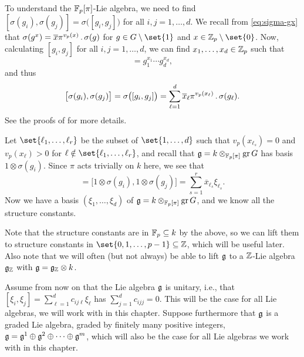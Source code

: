 To understand the $\mathbb{F}_{p}[\pi]$-Lie algebra, we need to find $[\sigma(g_{i}),\sigma(g_{j})] = \sigma\bigl( [g_{i},g_{j}] \bigr)$ for all $i,j = 1,\dotsc,d$. We recall from \eqref{eq:sigma-gx} that $\sigma(g^{x}) = \overline{x}\pi^{v_{p}(x)} \,.\, \sigma(g)$ for $g \in G \setminus\set{1}$ and $x \in \Z_{p}\setminus\set{0}$. Now, calculating $[g_{i},g_{j}]$ for all $i,j = 1,\dotsc,d$, we can find $x_{1},\dotsc,x_{d} \in \mathbb{Z}_{p}$ such that
\begin{equation*}
  [g_{i},g_{j}] = g_{1}^{x_{1}} \dotsb g_{d}^{x_{d}},
\end{equation*}
and thus
\begin{equation*}
  \bigl[ \sigma(g_{i}),\sigma(g_{j}) \bigr] = \sigma\bigl( [g_{i},g_{j}] \bigr) = \sum_{\ell=1}^{d} \overline{x}_{\ell}\pi^{v_{p}(x_{\ell})} \,.\, \sigma(g_{\ell}).
\end{equation*}
See the proofs of \cite[Lem.~26.4 and Prop.~26.5]{Sch} for more details.

Let $\set{\ell_{1},\dotsc,\ell_{r}}$ be the subset of $\set{1,\dotsc,d}$ such that $v_{p}(x_{\ell_{s}}) = 0$ and $v_{p}(x_{\ell}) > 0$ for $\ell \notin \set{\ell_{1},\dotsc,\ell_{r}}$, and recall that $\mathfrak{g} = k \otimes_{\mathbb{F}_{p}[\pi]} \operatorname{gr} G$ has basis $1 \otimes \sigma(g_{i})$. Since $\pi$ acts trivially on $k$ here, we see that
\begin{equation*}
  [\xi_{i},\xi_{j}] = \bigl[ 1\otimes\sigma(g_{i}),1\otimes\sigma(g_{j}) \bigr] = \sum_{s=1}^{r} \overline{x}_{\ell_{s}} \xi_{\ell_{s}}.
\end{equation*}
Now we have a basis $(\xi_{1},\dotsc,\xi_{d})$ of $\mathfrak{g} = k \otimes_{\mathbb{F}_{p}[\pi]} \operatorname{gr} G$, and we know all the structure constants.

\begin{remark}\label{rem:struc-consts-lift}
  Note that the structure constants are in $\mathbb{F}_{p} \subseteq k$ by the above, so we can lift them to structure constants in $\set{0,1,\dotsc,p-1} \subseteq \Z$, which will be useful later. Also note that we will often (but not always) be able to lift $\mathfrak{g}$ to a $\mathbb{Z}$-Lie algebra $\mathfrak{g}_{\mathbb{Z}}$ with $\mathfrak{g} = \mathfrak{g}_{\mathbb{Z}} \otimes k$.
\end{remark}

Assume from now on that the Lie algebra $\mathfrak{g}$ is unitary, i.e., that $[\xi_{i},\xi_{j}] = \sum_{\ell=1}^{d} c_{ij\ell} \xi_{\ell}$ has $\sum_{j=1}^{d} c_{ijj} = 0$. This will be the case for all Lie algebras, we will work with in this chapter. Suppose furthermore that $\mathfrak{g}$ is a graded Lie algebra, graded by finitely many positive integers, $\mathfrak{g} = \mathfrak{g}^{1} \oplus \mathfrak{g}^{2} \oplus \dotsb \oplus \mathfrak{g}^{m}$, which will also be the case for all Lie algebras we work with in this chapter.

